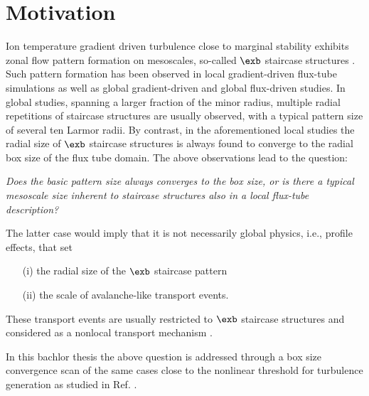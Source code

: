 
\chapter{Motivation}
\label{chap:motivation}

\thispagestyle{empty}
\newpage

Ion temperature gradient driven turbulence close to marginal stability exhibits zonal flow pattern formation on mesoscales, so-called $\exb$ staircase structures \cite{pradalier2010}.
Such pattern formation has been observed in local gradient-driven flux-tube simulations \cite{peeters2016, weikl2017, rath2021} as well as global gradient-driven \cite{mcmillan2009, villard2013, seo2022} and global flux-driven \cite{pradalier2010, pradalier2015, wang2020, kim2022, kishimoto2023} studies. 
In global studies, spanning a larger fraction of the minor radius, multiple radial repetitions of staircase structures are usually observed, with a typical pattern size of several ten Larmor radii.
By contrast, in the aforementioned local studies the radial size of $\exb$ staircase structures is always found to converge to the radial box size of the flux tube domain.
The above observations lead to the question: \bigskip


\textit{Does the basic pattern size always converges to the box size, or is there a typical mesoscale size inherent to staircase structures also in a local flux-tube description?}\bigskip

The latter case would imply that it is not necessarily global physics, i.e., profile effects, that set 
\begin{itemize}
	\item[(i)] the radial size of the $\exb$ staircase pattern
	\item[(ii)] the scale of avalanche-like transport events.
\end{itemize}
These transport events are usually restricted to $\exb$ staircase structures and considered as a nonlocal transport mechanism \cite{pradalier2010}. \bigskip

In this bachlor thesis the above question is addressed through a box size convergence scan of the same cases close to the nonlinear threshold for turbulence generation as studied in Ref. .
